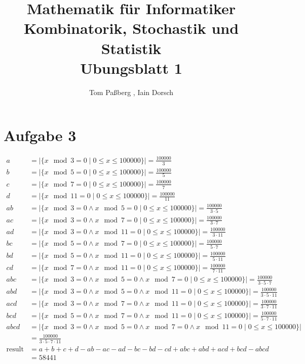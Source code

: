\documentclass[a4paper]{scrartcl}
\title{Mathematik für Informatiker \\ Kombinatorik, Stochastik und Statistik \\ Ubungsblatt 1}
\author{Tom Paßberg , Iain Dorsch}
\date{}
\begin{document}
\maketitle

\newpage

\section*{Aufgabe 3}
\begin{align*}
    a &= |\{ x \mod 3 = 0 \mid 0 \leq x \leq 100000 \}| = \frac{100000}{3} \\
    b &= |\{ x \mod 5 = 0 \mid 0 \leq x \leq 100000 \}| = \frac{100000}{5} \\
    c &= |\{ x \mod 7 = 0 \mid 0 \leq x \leq 100000 \}| = \frac{100000}{7} \\
    d &= |\{ x \mod 11 = 0 \mid 0 \leq x \leq 100000 \}| = \frac{100000}{11} \\
    ab &= |\{ x \mod 3 = 0 \land x \mod 5 = 0 \mid 0 \leq x \leq 100000 \}| = \frac{100000}{3 \cdot 5} \\
    ac &= |\{ x \mod 3 = 0 \land x \mod 7 = 0 \mid 0 \leq x \leq 100000 \}| = \frac{100000}{3 \cdot 7} \\
    ad &= |\{ x \mod 3 = 0 \land x \mod 11 = 0 \mid 0 \leq x \leq 100000 \}| = \frac{100000}{3 \cdot 11} \\
    bc &= |\{ x \mod 5 = 0 \land x \mod 7 = 0 \mid 0 \leq x \leq 100000 \}| = \frac{100000}{5 \cdot 7} \\
    bd &= |\{ x \mod 5 = 0 \land x \mod 11 = 0 \mid 0 \leq x \leq 100000 \}| = \frac{100000}{5 \cdot 11} \\
    cd &= |\{ x \mod 7 = 0 \land x \mod 11 = 0 \mid 0 \leq x \leq 100000 \}| = \frac{100000}{7 \cdot 11} \\
    abc &= |\{ x \mod 3 = 0 \land x \mod 5 = 0 \land x \mod 7 = 0 \mid 0 \leq x \leq 100000 \}| = \frac{100000}{3 \cdot 5 \cdot 7} \\
    abd &= |\{ x \mod 3 = 0 \land x \mod 5 = 0 \land x \mod 11 = 0 \mid 0 \leq x \leq 100000 \}| = \frac{100000}{3 \cdot 5 \cdot 11} \\
    acd &= |\{ x \mod 3 = 0 \land x \mod 7 = 0 \land x \mod 11 = 0 \mid 0 \leq x \leq 100000 \}| = \frac{100000}{3 \cdot 7 \cdot 11} \\
    bcd &= |\{ x \mod 5 = 0 \land x \mod 7 = 0 \land x \mod 11 = 0 \mid 0 \leq x \leq 100000 \}| = \frac{100000}{5 \cdot 7 \cdot 11} \\
    abcd &= |\{ x \mod 3 = 0 \land x \mod 5 = 0 \land x \mod 7 = 0 \land x \mod 11 = 0 \mid 0 \leq x \leq 100000 \}| \\&= \frac{100000}{3 \cdot 5 \cdot 7 \cdot 11} \\
    \text{result} &= a + b + c + d - ab - ac - ad - bc - bd - cd + abc + abd + acd + bcd - abcd \\&= 58441 \\
\end{align*}
\end{document}

